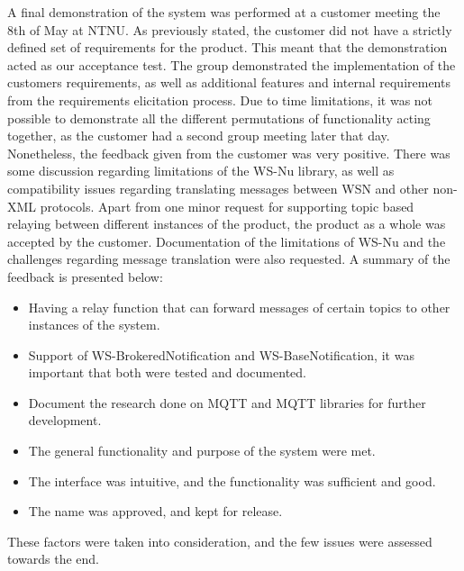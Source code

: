 A final demonstration of the system was performed at a customer meeting the 8th of May at NTNU. As previously stated, the customer did not have a strictly defined set of requirements for the product. This meant that the demonstration acted as our acceptance test. The group demonstrated the implementation of the customers requirements, as well as additional features and internal requirements from the requirements elicitation process. Due to time limitations, it was not possible to demonstrate all the different permutations of functionality acting together, as the customer had a second group meeting later that day. Nonetheless, the feedback given from the customer was very positive. There was some discussion regarding limitations of the WS-Nu library, as well as compatibility issues regarding translating messages between WSN and other non-XML protocols. Apart from one minor request for supporting topic based relaying between different instances of the product, the product as a whole was accepted by the customer. Documentation of the limitations of WS-Nu and the challenges regarding message translation were also requested. A summary of the feedback is presented below:

\begin{itemize}
\item Having a relay function that can forward messages of certain topics to other instances of the system.
\item Support of WS-BrokeredNotification \cite{wsn-brokerednotification} and WS-BaseNotification, it was important that both were tested and documented.
\item Document the research done on MQTT and MQTT libraries for further development.
\item The general functionality and purpose of the system were met.
\item The interface was intuitive, and the functionality was sufficient and good.
\item The name was approved, and kept for release.
\end{itemize}

These factors were taken into consideration, and the few issues were assessed towards the end.

\clearpage